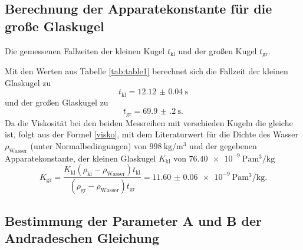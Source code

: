 \subsection{Berechnung der Apparatekonstante für die große Glaskugel}
\begin{table}
	\centering
	\caption{Die gemessenen Fallzeiten der kleinen Kugel $t_\text{kl}$ und der großen Kugel $t_\text{gr}$.}
	
\end{table}
Mit den Werten aus Tabelle \ref{tab:table1} berechnet sich die Fallzeit der kleinen Glaskugel zu
\begin{displaymath}
	t_\text{kl} = \SI{12.12(4)}{\second}
\end{displaymath}
und der großen Glaskugel zu
\begin{displaymath}
	t_\text{gr} = \SI{69.9(2)}{\second}\text{.}
\end{displaymath}
Da die Viskosität bei den beiden Messreihen mit verschieden Kugeln die gleiche ist, folgt aus der Formel \eqref{visko}, mit dem Literaturwert für die Dichte des Wasser $\rho_\text{Wasser}$ (unter Normalbedingungen) von $\SI{998}{\kilo\gram\per\meter\tothe{3}}$ \cite{eta} und der gegebenen Apparatekonstante, der kleinen Glaskugel $K_\text{kl}$ von $\SI{76.40e-9}{\pascal\meter\tothe{3}\per\kilo\gram}$
\begin{displaymath}
	K_\text{gr} = \frac{K_\text{kl} \left( \rho_\text{kl} - \rho_\text{Wasser}\right) t_\text{kl}}{\left( \rho_\text{gr} - \rho_\text{Wasser}\right) t_\text{gr}} = \SI{11.60(6)e-9}{\pascal\meter\tothe{3}\per\kilo\gram}\text{.}
\end{displaymath}

\subsection{Bestimmung der Parameter A und B der Andradeschen Gleichung}


